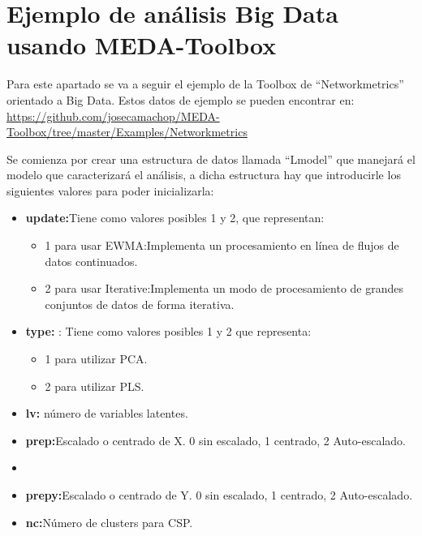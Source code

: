 \bigskip

\section{Ejemplo de análisis Big Data usando MEDA-Toolbox}

Para este apartado se va a seguir el ejemplo de la Toolbox de “Networkmetrics” orientado a Big Data. Estos datos de ejemplo se pueden encontrar en: \url{https://github.com/josecamachop/MEDA-Toolbox/tree/master/Examples/Networkmetrics}

\bigskip

Se comienza por crear una estructura de datos llamada “Lmodel” que manejará el modelo que caracterizará el análisis, a dicha estructura hay que introducirle los siguientes valores para poder inicializarla:
\bigskip

\begin{itemize}
	\item \textbf{update:}Tiene como valores posibles 1 y 2, que representan: \begin{itemize}
		\item 1 para usar EWMA:Implementa un procesamiento en línea de flujos de datos continuados.
		\item 2 para usar Iterative:Implementa un modo de procesamiento de grandes conjuntos de datos de forma iterativa.
	\end{itemize}
	
	\item \textbf{type:} : Tiene como valores posibles 1 y 2 que representa: \begin{itemize}
		\item 1 para utilizar PCA.
		\item 2 para utilizar PLS.
	\end{itemize}

	\item \textbf{lv:} número de variables latentes. 
	
	\item \textbf{prep:}Escalado o centrado de X. 0 sin escalado, 1 centrado, 2 Auto-escalado.
	
	\item 
	\item \textbf{prepy:}Escalado o centrado de Y. 0 sin escalado, 1 centrado, 2 Auto-escalado.
	
	\item\textbf{nc:}Número de clusters para CSP.
\end{itemize}

